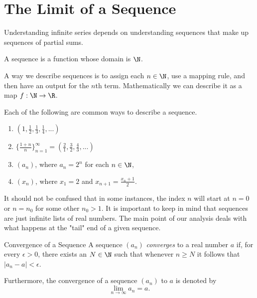 
\section{The Limit of a Sequence}

Understanding infinite series depends on understanding sequences that make up sequences of partial sums.

\begin{definition}{}{}
A sequence is a function whose domain is \( \N \).
\end{definition}

A way we describe sequences is to assign each \( n \in \N \), use a mapping rule, and then have an output for the \( n \)th term. Mathematically we can describe it as a map \( f: \N \to \R \).

\begin{example}{}{}
    Each of the following are common ways to describe a sequence. 
    \begin{enumerate}
        \item \( (1, \frac{1}{2},  \frac{1}{3}, \frac{1}{4},...  )\)
        \item \( \{  \frac{1+n}{n}  \}_{n=1}^{ \infty} = ( \frac{2}{1}, \frac{3}{2}, \frac{4}{3}, ...)\)
        \item \( (a_n) \), where \( a_n = 2^n \) for each \( n \in \N \),
        \item \( (x_n)\), where \( x_1 = 2 \) and \( x_{n+1} = \frac{x_n + 1 }{2}\).
    \end{enumerate}
\end{example}
It should not be confused that in some instances, the index \( n \) will start at \( n = 0 \) or \( n = n_0 \) for some other \( n_0 > 1 \). It is important to keep in mind that sequences are just infinite lists of real numbers. The main point of our analysis deals with what happens at the "tail" end of a given sequence. 

\begin{definition}{Convergence of a Sequence}{}
A sequence \( (a_n) \) \textit{converges} to a real number \( a \) if, for every \( \epsilon > 0 \), there exists an \( N \in \N \) such that whenever \( n \geq N \) it follows that \( |a_n - a | < \epsilon \).
\end{definition}
Furthermore, the convergence of a sequence \( (a_n) \) to \( a \) is denoted by 
\[ \lim_{n \to \infty} a_n = a.\]

